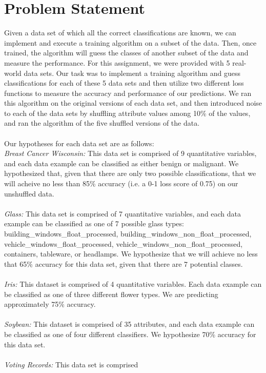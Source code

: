 \documentclass[twoside,11pt]{article}
\begin{document}
\section{Problem Statement}
Given a data set of which all the correct classifications are known, we can implement and execute a training algorithm on a subset of the data. Then, once trained, the algorithm will guess the classes of another subset of the data and measure the performance. For this assignment, we were provided with 5 real-world data sets. Our task was to implement a training algorithm and guess classifications for each of these 5 data sets and then utilize two different loss functions to measure the accuracy and performance of our predictions. We ran this algorithm on the original versions of each data set, and then introduced noise to each of the data sets by shuffling attribute values among 10\% of the values, and ran the algorithm of the five shuffled versions of the data. \\ \\
Our hypotheses for each data set are as follows: \\

\textit{Breast Cancer Wisconsin:} This data set is comprised of 9 quantitative variables, and each data example can be classified as either benign or malignant. We hypothesized that, given that there are only two possible classifications, that we will acheive no less than 85\% accuracy (i.e. a 0-1 loss score of 0.75) on our unshuffled data. \\ \\
\textit{Glass:} This data set is comprised of 7 quantitative variables, and each data example can be classified as one of 7 possible glass types: building\_windows\_float\_processed, building\_windows\_non\_float\_processed, vehicle\_windows\_float\_processed, vehicle\_windows\_non\_float\_processed, containers, tableware, or headlamps. We hypothesize that we will achieve no less that 65\% accuracy for this data set, given that there are 7 potential classes. \\ \\
\textit{Iris:} This dataset is comprised of 4 quantitative variables. Each data example can be classified as one of three different flower types. We are predicting approximately 75\% accuracy. \\ \\
\textit{Soybean:} This dataset is comprised of 35 attributes, and each data example can be classified as one of four different classifiers. We hypothesize 70\% accuracy for this data set. \\ \\
\textit{Voting Records:} This data set is comprised \\
\end{document}
